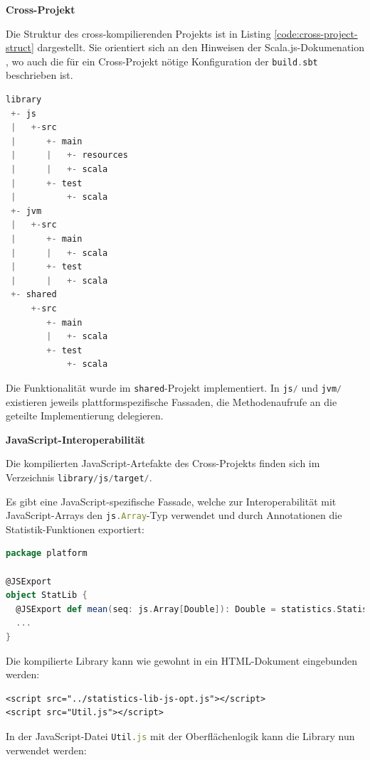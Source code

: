 \documentclass[a4paper, 12pt, hidelinks, listof=totoc, listoftables=totoc, bibliography=totoc]{scrreprt}
\newcommand{\code}[1]{\lstinline[language=Scala, style=inline]|#1|}
\newcommand{\js}[1]{\lstinline[language=JavaScript, style=inline]|#1|}
\newcommand{\MyMiniSec}[1]{\rmfamily\fontsize{12}{15}\selectfont
	\vspace{7pt}\textbf{#1} %
}
\begin{document}
\MyMiniSec{Cross-Projekt}

Die Struktur des cross-kompilierenden Projekts ist in Listing \ref{code:cross-project-struct} dargestellt. Sie orientiert sich an den Hinweisen der Scala.js-Dokumenation \cite{scalajs.CBP}, wo auch die für ein Cross-Projekt nötige Konfiguration der \code{build.sbt} beschrieben ist.

\begin{lstlisting}[language=scala, caption={Struktur der cross-kompilierenden Scala.js-Library}, label={code:cross-project-struct}]
library
 +- js
 |   +-src
 |      +- main
 |      |   +- resources
 |      |   +- scala
 |      +- test
 |          +- scala
 +- jvm
 |   +-src
 |      +- main
 |      |   +- scala
 |      +- test
 |      |   +- scala
 +- shared
     +-src
        +- main
        |   +- scala
        +- test
            +- scala
\end{lstlisting}

Die Funktionalität wurde im \code{shared}-Projekt implementiert. In \code{js/} und \code{jvm/} existieren jeweils plattformspezifische Fassaden, die Methodenaufrufe an die geteilte Implementierung delegieren.


\pagebreak

\MyMiniSec{JavaScript-Interoperabilität}

Die kompilierten JavaScript-Artefakte des Cross-Projekts finden sich im Verzeichnis \linebreak\mbox{\code{library/js/target/}}.

Es gibt eine JavaScript-spezifische Fassade, welche zur Interoperabilität mit JavaScript-Arrays den \js{js.Array}-Typ verwendet und durch Annotationen die Statistik-Funktionen exportiert:

\begin{lstlisting}[language=Scala, style=snippet]
package platform

@JSExport
object StatLib {
  @JSExport def mean(seq: js.Array[Double]): Double = statistics.Statistics.mean(seq)
  ...
}
\end{lstlisting}

Die kompilierte Library kann wie gewohnt in ein \ac{HTML}-Dokument eingebunden werden:

\begin{lstlisting}[language=HTML5, style=snippet]
<script src="../statistics-lib-js-opt.js"></script>
<script src="Util.js"></script>
\end{lstlisting}

In der JavaScript-Datei \js{Util.js} mit der Oberflächenlogik kann die Library nun verwendet werden:
\end{document}
